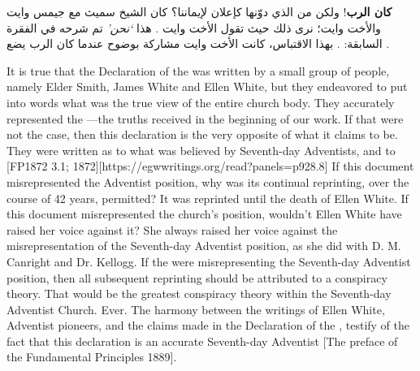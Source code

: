  \textbf{كان الرب}! ولكن من الذي دوّنها كإعلان لإيماننا؟ كان الشيخ سميث مع جيمس وايت والأخت وايت؛ نرى ذلك حيث تقول الأخت وايت . هذا \textit{‘نحن’} تم شرحه في الفقرة السابقة: . بهذا الاقتباس، كانت الأخت وايت مشاركة بوضوح عندما كان الرب يضع .


It is true that the Declaration of the  was written by a small group of people, namely Elder Smith, James White and Ellen White, but they endeavored to put into words what was the true view of the entire church body. They accurately represented the —the truths received in the beginning of our work. If that were not the case, then this declaration is the very opposite of what it claims to be. They were written  as to what was believed by Seventh-day Adventists,  and to [FP1872 3.1; 1872][https://egwwritings.org/read?panels=p928.8] If this document misrepresented the Adventist position, why was its continual reprinting, over the course of 42 years, permitted? It was reprinted until the death of Ellen White. If this document misrepresented the church’s position, wouldn’t Ellen White have raised her voice against it? She always raised her voice against the misrepresentation of the Seventh-day Adventist position, as she did with D. M. Canright and Dr. Kellogg. If the  were misrepresenting the Seventh-day Adventist position, then all subsequent reprinting should be attributed to a conspiracy theory. That would be the greatest conspiracy theory within the Seventh-day Adventist Church. Ever. The harmony between the writings of Ellen White, Adventist pioneers, and the claims made in the Declaration of the , testify of the fact that this declaration is an accurate  Seventh-day Adventist [The preface of the Fundamental Principles 1889].


